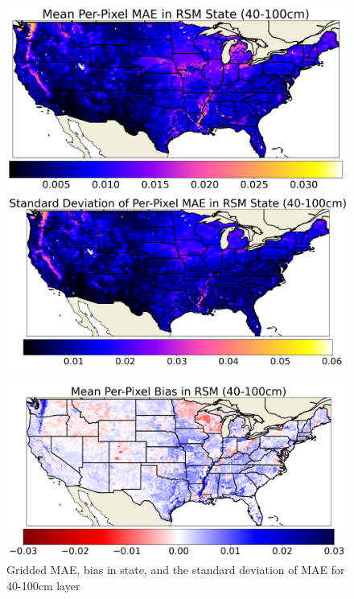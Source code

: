 \begin{figure}[hp!]
    \centering

    \includegraphics[width=.48\linewidth,draft=false]{figures/grid-eval_lstm-rsm-9_full/eval-grid_full_lstm-rsm-9_rsm-100_spatial-stats_abs-err_state-err-abs-mean.png}
    \includegraphics[width=.48\linewidth,draft=false]{figures/grid-eval_lstm-rsm-9_full/eval-grid_full_lstm-rsm-9_rsm-100_spatial-stats_abs-err_state-err-abs-stdev.png}

    \includegraphics[width=.48\linewidth,draft=false]{figures/grid-eval_lstm-rsm-9_full/eval-grid_full_lstm-rsm-9_rsm-100_spatial-stats_bias_state-err-bias-mean.png}

    \caption{Gridded MAE, bias in state, and the standard deviation of MAE for 40-100cm layer}
    \label{lstm-rsm-9-grid-rsm-100}
\end{figure}

